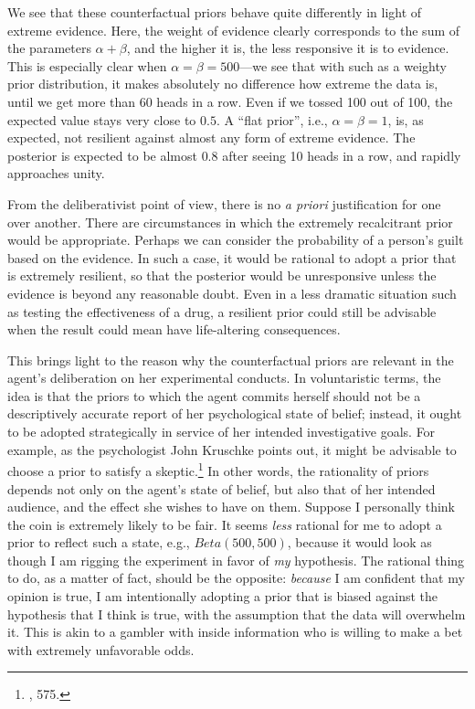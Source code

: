 We see that these counterfactual priors behave quite differently in
light of extreme evidence. Here, the weight of evidence clearly
corresponds to the sum of the parameters \(\alpha + \beta\), and the
higher it is, the less responsive it is to evidence. This is especially
clear when \(\alpha = \beta = 500\)---we see that with such as a weighty
prior distribution, it makes absolutely no difference how extreme
the data is, until we get more than 60 heads in a row. Even if we tossed
100 out of 100, the expected value stays very close to \(0.5\). A ``flat
prior'', i.e., \(\alpha = \beta = 1\), is, as expected, not resilient
against almost any form of extreme evidence. The posterior is expected
to be almost \(0.8\) after seeing 10 heads in a row, and rapidly approaches
unity.

From the deliberativist point of view, there is no \emph{a priori}
justification for one over another. There are circumstances in which the
extremely recalcitrant prior would be appropriate. Perhaps we can
consider the probability of a person's guilt based on the evidence. In
such a case, it would be rational to adopt a prior that is extremely
resilient, so that the posterior would be unresponsive unless the
evidence is beyond any reasonable doubt. Even in a less dramatic
situation such as testing the effectiveness of a drug, a resilient prior
could still be advisable when the result could mean have life-altering
consequences.

This brings light to the reason why the counterfactual priors are relevant in the agent's deliberation on her experimental conducts. In voluntaristic terms, the idea is that the priors to which the agent commits herself should not be a descriptively accurate report of her psychological state of belief; instead, it ought to be adopted strategically in service of her intended investigative goals. For example, as the psychologist John Kruschke points out, it might be
advisable to choose a prior to satisfy a skeptic.\footnote{\cite{bayessupert}, 575.} In other words, the rationality of priors depends not only on the agent's state of belief, but also that of her intended audience, and the effect she wishes to have on them. Suppose I personally think the coin is extremely likely to be
fair. It seems \emph{less} rational for me to adopt a prior to reflect
such a state, e.g., \(Beta(500,500)\), because it would look as though
I am rigging the experiment in favor of \emph{my} hypothesis. The
rational thing to do, as a matter of fact, should be the opposite:
\emph{because} I am confident that my opinion is true, I am
intentionally adopting a prior that is biased against the hypothesis that I think is true, with the assumption that the
data will overwhelm it. This is akin to a gambler with inside
information who is willing to make a bet with extremely unfavorable
odds. 

